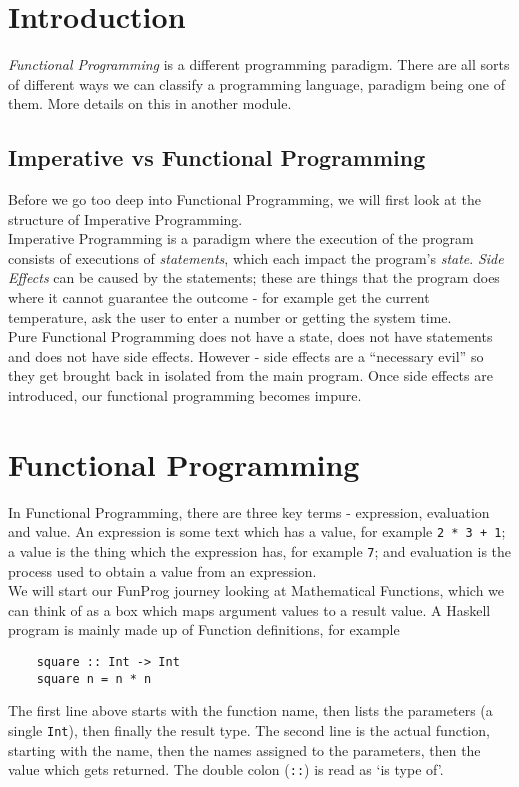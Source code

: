 
\section{Introduction}
\textit{Functional Programming} is a different programming paradigm. There are all sorts of different ways we can classify a programming language, paradigm being one of them. More details on this in another module.

\subsection{Imperative vs Functional Programming}
Before we go too deep into Functional Programming, we will first look at the structure of Imperative Programming.\\

Imperative Programming is a paradigm where the execution of the program consists of executions of \textit{statements}, which each impact the program's \textit{state}. \textit{Side Effects} can be caused by the statements; these are things that the program does where it cannot guarantee the outcome - for example get the current temperature, ask the user to enter a number or getting the system time.\\

Pure Functional Programming does not have a state, does not have statements and does not have side effects. However - side effects are a ``necessary evil'' so they get brought back in isolated from the main program. Once side effects are introduced, our functional programming becomes impure.

\section{Functional Programming}
In Functional Programming, there are three key terms - expression, evaluation and value. An expression is some text which has a value, for example \verb|2 * 3 + 1|; a value is the thing which the expression has, for example \verb|7|; and evaluation is the process used to obtain a value from an expression.\\

We will start our FunProg journey looking at Mathematical Functions, which we can think of as a box which maps argument values to a result value. A Haskell program is mainly made up of Function definitions, for example
\begin{verbatim}
    square :: Int -> Int
    square n = n * n
\end{verbatim}
The first line above starts with the function name, then lists the parameters (a single \verb|Int|), then finally the result type. The second line is the actual function, starting with the name, then the names assigned to the parameters, then the value which gets returned. The double colon (\verb|::|) is read as `is type of'. \\

